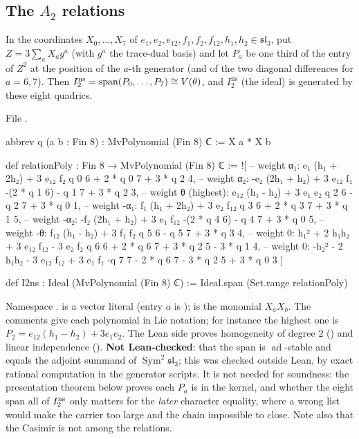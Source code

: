 \subsection{The $A_2$ relations}

\begin{definition}\label{l24:def:A2rel}
In the coordinates $X_0,\dots,X_7$ of $e_1,e_2,e_{12},f_1,f_2,f_{12},h_1,h_2\in\mathfrak{sl}_3$, put
$Z=3\sum_aX_ag^a$ (with $g^a$ the trace-dual basis) and let $P_a$ be one third of the entry of $Z^2$ at the
position of the $a$-th generator (and of the two diagonal differences for $a=6,7$). Then
$I_2^{\mathrm{ns}}=\operatorname{span}(P_0,\dots,P_7)\cong V(\theta)$, and $I_2^{\mathrm{ns}}$ (the ideal)
is generated by these eight quadrics.
\end{definition}
\noindent File .
\begin{leancode}
abbrev q (a b : Fin 8) : MvPolynomial (Fin 8) ℂ := X a * X b

def relationPoly : Fin 8 → MvPolynomial (Fin 8) ℂ :=
  ![ -- weight α₁:  e₁ (h₁ + 2h₂) + 3 e₁₂ f₂
     q 0 6 + 2 * q 0 7 + 3 * q 2 4,
     -- weight α₂:  -e₂ (2h₁ + h₂) + 3 e₁₂ f₁
     -(2 * q 1 6) - q 1 7 + 3 * q 2 3,
     -- weight θ (highest):  e₁₂ (h₁ - h₂) + 3 e₁ e₂
     q 2 6 - q 2 7 + 3 * q 0 1,
     -- weight -α₁:  f₁ (h₁ + 2h₂) + 3 e₂ f₁₂
     q 3 6 + 2 * q 3 7 + 3 * q 1 5,
     -- weight -α₂:  -f₂ (2h₁ + h₂) + 3 e₁ f₁₂
     -(2 * q 4 6) - q 4 7 + 3 * q 0 5,
     -- weight -θ:  f₁₂ (h₁ - h₂) + 3 f₁ f₂
     q 5 6 - q 5 7 + 3 * q 3 4,
     -- weight 0:  h₁² + 2 h₁h₂ + 3 e₁₂ f₁₂ - 3 e₂ f₂
     q 6 6 + 2 * q 6 7 + 3 * q 2 5 - 3 * q 1 4,
     -- weight 0:  -h₂² - 2 h₁h₂ - 3 e₁₂ f₁₂ + 3 e₁ f₁
     -q 7 7 - 2 * q 6 7 - 3 * q 2 5 + 3 * q 0 3 ]

def I2ns : Ideal (MvPolynomial (Fin 8) ℂ) := Ideal.span (Set.range relationPoly)
\end{leancode}

\begin{dictionary}
Namespace . \lean{![…]} is a vector literal (entry $a$ is );
 is the monomial $X_aX_b$. The comments give each polynomial in Lie notation; for
instance the highest one is $P_2=e_{12}(h_1-h_2)+3e_1e_2$. The Lean side proves homogeneity of degree $2$
() and linear independence ().
\textbf{Not Lean-checked}: that the span is $\operatorname{ad}$-stable and equals the adjoint summand of
$\operatorname{Sym}^2\mathfrak{sl}_3$; this was checked outside Lean, by exact rational computation in the generator
scripts. It is
not needed for soundness: the presentation theorem below proves each $P_a$ is in the kernel, and whether
the eight span all of $I_2^{\mathrm{ns}}$ only matters for the \emph{later} character equality, where a wrong
list would make the carrier too large and the chain impossible to close. Note also that the Casimir is not
among the relations.
\end{dictionary}

